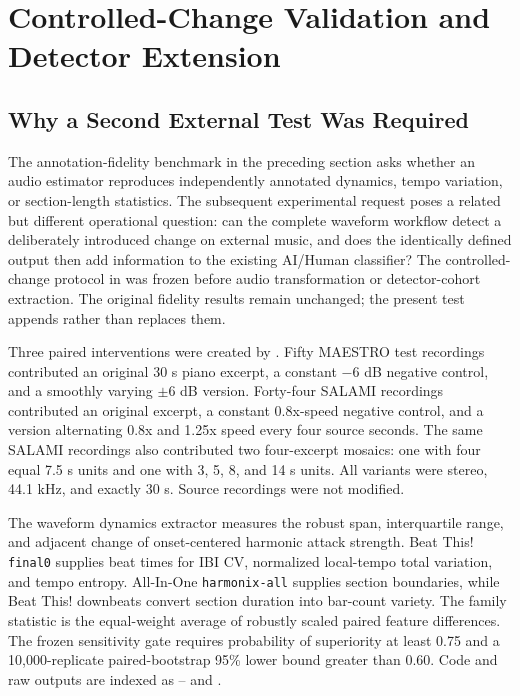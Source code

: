 \section{Controlled-Change Validation and Detector Extension}
\label{sec:change-extension}

\subsection{Why a Second External Test Was Required}

The annotation-fidelity benchmark in the preceding section asks whether an
audio estimator reproduces independently annotated dynamics, tempo variation,
or section-length statistics.  The subsequent experimental request poses a
related but different operational question: can the complete waveform
workflow detect a deliberately introduced change on external music, and does
the identically defined output then add information to the existing AI/Human
classifier?  The controlled-change protocol in  was frozen before
audio transformation or detector-cohort extraction.  The original fidelity
results remain unchanged; the present test appends rather than replaces them.

Three paired interventions were created by .  Fifty MAESTRO test
recordings contributed an original 30 s piano excerpt, a constant $-6$ dB
negative control, and a smoothly varying $\pm6$ dB version.  Forty-four SALAMI
recordings contributed an original excerpt, a constant 0.8x-speed negative
control, and a version alternating 0.8x and 1.25x speed every four source
seconds.  The same SALAMI recordings also contributed two four-excerpt
mosaics: one with four equal 7.5 s units and one with 3, 5, 8, and 14 s units.
All variants were stereo, 44.1 kHz, and exactly 30 s.  Source recordings were
not modified.

The waveform dynamics extractor measures the robust span, interquartile
range, and adjacent change of onset-centered harmonic attack strength.  Beat
This! \texttt{final0} supplies beat times for IBI CV, normalized local-tempo
total variation, and tempo entropy.  All-In-One \texttt{harmonix-all} supplies
section boundaries, while Beat This! downbeats convert section duration into
bar-count variety.  The family statistic is the equal-weight average of
robustly scaled paired feature differences.  The frozen sensitivity gate
requires probability of superiority at least 0.75 and a 10,000-replicate
paired-bootstrap 95\% lower bound greater than 0.60.  Code and raw outputs are
indexed as -- and .

